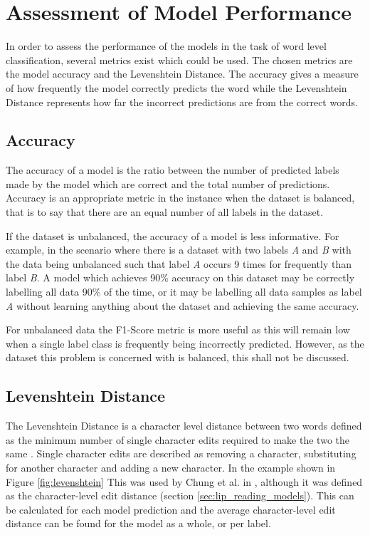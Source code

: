 \section{Assessment of Model Performance}
In order to assess the performance of the models in the task of word level classification, several metrics exist which could be used.
The chosen metrics are the model accuracy and the Levenshtein Distance.
The accuracy gives a measure of how frequently the model correctly predicts the word while the Levenshtein Distance represents how far the incorrect predictions are from the correct words.

\subsection{Accuracy}
The accuracy of a model is the ratio between the number of predicted labels made by the model which are correct and the total number of predictions.
Accuracy is an appropriate metric in the instance when the dataset is balanced, that is to say that there are an equal number of all labels in the dataset.

If the dataset is unbalanced, the accuracy of a model is less informative.
For example, in the scenario where there is a dataset with two labels \textit{A} and \textit{B} with the data being unbalanced such that label \textit{A} occurs 9 times for frequently than label \textit{B}.
A model which achieves 90\% accuracy on this dataset may be correctly labelling all data 90\% of the time, or it may be labelling all data samples as label \textit{A} without learning anything about the dataset and achieving the same accuracy.

For unbalanced data the F1-Score metric is more useful as this will remain low when a single label class is frequently being incorrectly predicted.
However, as the dataset this problem is concerned with is balanced, this shall not be discussed.

\subsection{Levenshtein Distance}
The Levenshtein Distance is a character level distance between two words defined as the minimum number of single character edits required to make the two the same \cite{Levenshtein1966}.
Single character edits are described as removing a character, substituting for another character and adding a new character.
In the example shown in Figure \ref{fig:levenshtein}
This was used by Chung et al. in \cite{Cheng2016}, although it was defined as the character-level edit distance (section \ref{sec:lip_reading_models}).
This can be calculated for each model prediction and the average character-level edit distance can be found for the model as a whole, or per label.

